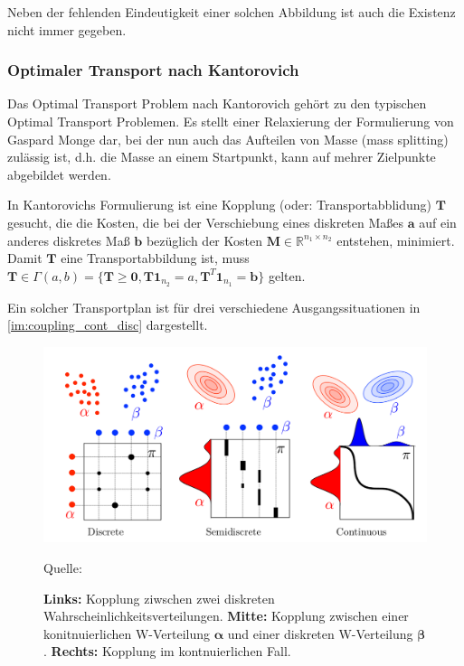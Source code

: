 \documentclass[11pt,a4paper]{article}
\newcommand{\source}[1]{\caption*{\small \hfill Quelle: {#1}} }
\numberwithin{equation}{section}
\begin{document}
	Neben der fehlenden Eindeutigkeit einer solchen Abbildung ist auch die Existenz nicht immer gegeben.
			
	\subsubsection{Optimaler Transport nach Kantorovich}
	
	Das Optimal Transport Problem nach Kantorovich gehört zu den typischen Optimal Transport Problemen. Es stellt einer Relaxierung der Formulierung von Gaspard Monge dar, bei der nun auch das Aufteilen von Masse (mass splitting) zulässig ist, d.h. die Masse an einem Startpunkt, kann auf mehrer Zielpunkte abgebildet werden.
	
	In Kantorovichs Formulierung ist eine Kopplung (oder: Transportabblidung) $\boldsymbol{T}$ gesucht, die die Kosten, die bei der Verschiebung eines diskreten Maßes $\boldsymbol{a}$ auf ein anderes diskretes Maß $\boldsymbol{b}$ bezüglich der Kosten $\boldsymbol{M} \in \mathbb{R}^{n_1 \times n_2}$ entstehen, minimiert.
	Damit $\boldsymbol{T}$ eine Transportabbildung ist, muss $\boldsymbol{T} \in \Gamma(a,b) = \lbrace \boldsymbol{T} \geq \boldsymbol{0}, \boldsymbol{T}\boldsymbol{1}_{n_2} = a, \boldsymbol{T}^{T}\boldsymbol{1}_{n_1} = \boldsymbol{b} \rbrace$ gelten.
	
	Ein solcher Transportplan ist für drei verschiedene Ausgangssituationen in \autoref{im:coupling_cont_disc} dargestellt.
	
	\begin{figure}[ht]
		\centering
		\includegraphics[width=0.4\textheight]{coupling_disc_semid_cont.png}
		\caption[Transportpläne im diskreten, semi-diskreten und kontinuierlichen Fall]{\textbf{Links: }Kopplung ziwschen zwei diskreten Wahrscheinlichkeitsverteilungen. \textbf{ Mitte: }Kopplung zwischen einer konitnuierlichen W-Verteilung $\boldsymbol{\alpha}$ und einer diskreten W-Verteilung $\boldsymbol{\beta}$. \textbf{Rechts: }Kopplung im kontnuierlichen Fall.}
		\source{\cite{COTcuturi}}
		\label{im:couplings}
	\end{figure}
	
\end{document}

